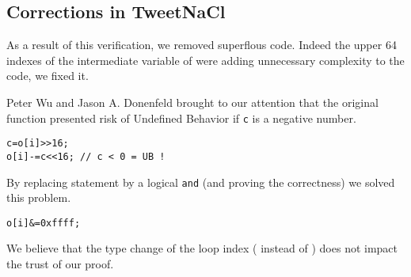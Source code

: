 \subsection{Corrections in TweetNaCl}

As a result of this verification, we removed superflous code.
Indeed the upper 64 indexes of the  intermediate variable of
 were adding unnecessary complexity to the code, we fixed it.

Peter Wu and Jason A. Donenfeld brought to our attention that the original
 function presented risk of Undefined Behavior if \texttt{c}
is a negative number.
\begin{lstlisting}[language=Ctweetnacl]
c=o[i]>>16;
o[i]-=c<<16; // c < 0 = UB !
\end{lstlisting}
By replacing statement by a logical \texttt{and} (and proving the correctness)
we solved this problem.
\begin{lstlisting}[language=Ctweetnacl]
o[i]&=0xffff;
\end{lstlisting}

We believe that the type change of the loop index ( instead of )
does not impact the trust of our proof.

